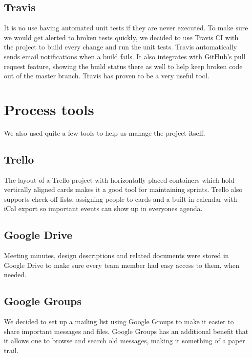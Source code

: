 \subsection{Travis}

It is no use having automated unit tests if they are never executed. To make sure we would get alerted to broken tests quickly, we decided to use Travis CI with the project to build every change and run the unit tests. Travis automatically sends email notifications when a build fails. It also integrates with GitHub's pull request feature, showing the build status there as well to help keep broken code out of the master branch. Travis has proven to be a very useful tool.  

\section{Process tools}

We also used quite a few tools to help us manage the project itself.

\subsection{Trello}

The layout of a Trello project with horizontally placed containers which hold vertically aligned cards makes it a good tool for maintaining sprints. Trello also supports check-off lists, assigning people to cards and a built-in calendar with iCal export so important events can show up in everyones agenda. 

\subsection{Google Drive}

Meeting minutes, design descriptions and related documents were stored in Google Drive to make sure every team member had easy access to them, when needed. 

\subsection{Google Groups}

We decided to set up a mailing list using Google Groups to make it easier to share important messages and files. Google Groups has an additional benefit that it allows one to browse and search old messages, making it something of a paper trail. 
